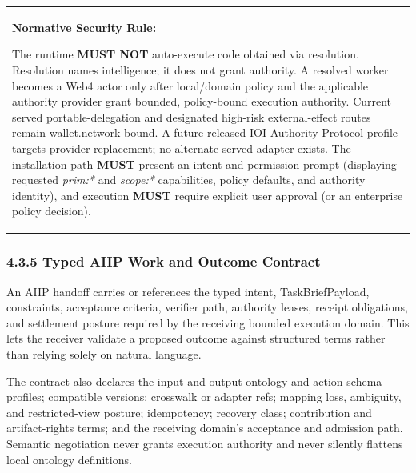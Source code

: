 \documentclass[
  11pt,
]{article}
\begin{document}
\begin{longtable}[]{@{}
  >{\raggedright\arraybackslash}p{}@{}}
\toprule\noalign{}
 \\
\midrule\noalign{}
\endhead
\bottomrule\noalign{}
\endlastfoot
\textbf{Normative Security Rule:}\emph{\textbf{ }}

The runtime \textbf{MUST NOT} auto-execute code obtained via resolution.
Resolution names intelligence; it does not grant authority. A resolved
worker becomes a Web4 actor only after local/domain policy and the applicable
authority provider grant bounded, policy-bound execution authority.
Current served portable-delegation and designated high-risk external-effect
routes remain wallet.network-bound. A future released IOI Authority Protocol
profile targets provider replacement; no alternate served adapter exists. The
installation path \textbf{MUST} present an intent
and permission prompt (displaying requested \emph{prim:*} and
\emph{scope:*} capabilities, policy defaults, and authority identity),
and execution \textbf{MUST} require explicit user approval (or an
enterprise policy decision). \\
\end{longtable}

\hypertarget{the-intent-contract-schema-ics-1}{%
\subsubsection{4.3.5 Typed AIIP Work and Outcome
Contract}\label{the-intent-contract-schema-ics-1}}

An AIIP handoff carries or references the typed intent, TaskBriefPayload,
constraints, acceptance criteria, verifier path, authority leases, receipt
obligations, and settlement posture required by the receiving bounded
execution domain. This lets the receiver validate a proposed outcome against
structured terms rather than relying solely on natural language.

The contract also declares the input and output ontology and action-schema
profiles; compatible versions; crosswalk or adapter refs; mapping loss,
ambiguity, and restricted-view posture; idempotency; recovery class;
contribution and artifact-rights terms; and the receiving domain's acceptance
and admission path. Semantic negotiation never grants execution authority and
never silently flattens local ontology definitions.
\end{document}
